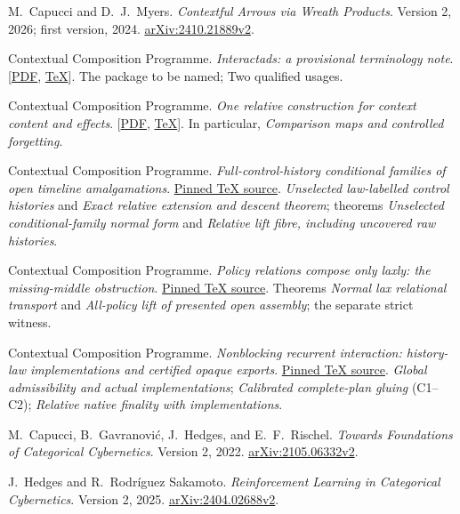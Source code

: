 \documentclass[11pt]{article}
\theoremstyle{definition}
\newcommand{\reporev}{777a28abb23ba9ccf9a98d0d14e0fb845907c5a8}
\newcommand{\reposrc}[2]{\href{https://github.com/eternal-november/eos-research-programmes/blob/\reporev/projects/contextual-composition/#1}{#2}}
\begin{document}
\begin{thebibliography}{9}
M.~Capucci and D.~J.~Myers.
\emph{Contextful Arrows via Wreath Products}.
Version 2, 2026; first version, 2024.
\href{https://arxiv.org/abs/2410.21889v2}{arXiv:2410.21889v2}.

Contextual Composition Programme.
\emph{Interactads: a provisional terminology note}.
[\reposrc{foundations/terminology/Interactad_Terminology_Note.pdf}{PDF},
\reposrc{foundations/terminology/Interactad_Terminology_Note.tex}{TeX}].
The package to be named; Two qualified usages.

Contextual Composition Programme.
\emph{One relative construction for context content and effects}.
[\reposrc{foundations/relative-construction/delivery/One_relative_construction_for_context_content_and_effects.pdf}{PDF},
\reposrc{foundations/relative-construction/delivery/One_relative_construction_for_context_content_and_effects.tex}{TeX}].
In particular, \emph{Comparison maps and controlled forgetting}.

Contextual Composition Programme.
\emph{Full-control-history conditional families of open timeline amalgamations}.
\reposrc{foundations/native-whole-scope-feedback/Conditional_Open_Timeline_Families.tex}{Pinned TeX source}.
\emph{Unselected law-labelled control histories} and
\emph{Exact relative extension and descent theorem}; theorems
\emph{Unselected conditional-family normal form} and
\emph{Relative lift fibre, including uncovered raw histories}.

Contextual Composition Programme.
\emph{Policy relations compose only laxly: the missing-middle obstruction}.
\reposrc{foundations/native-whole-scope-feedback/Policy_Relational_Transport.tex}{Pinned TeX source}.
Theorems \emph{Normal lax relational transport} and
\emph{All-policy lift of presented open assembly}; the separate strict witness.

Contextual Composition Programme.
\emph{Nonblocking recurrent interaction: history-law implementations and certified opaque exports}.
\reposrc{foundations/native-whole-scope-feedback/Nonblocking_History_Controllers_and_Certified_Exports.tex}{Pinned TeX source}.
\emph{Global admissibility and actual implementations};
\emph{Calibrated complete-plan gluing} (C1--C2);
\emph{Relative native finality with implementations}.

M.~Capucci, B.~Gavranovi\'c, J.~Hedges, and E.~F.~Rischel.
\emph{Towards Foundations of Categorical Cybernetics}.
Version 2, 2022.
\href{https://arxiv.org/abs/2105.06332v2}{arXiv:2105.06332v2}.

J.~Hedges and R.~Rodr\'iguez Sakamoto.
\emph{Reinforcement Learning in Categorical Cybernetics}.
Version 2, 2025.
\href{https://arxiv.org/abs/2404.02688v2}{arXiv:2404.02688v2}.
\end{thebibliography}
\end{document}
